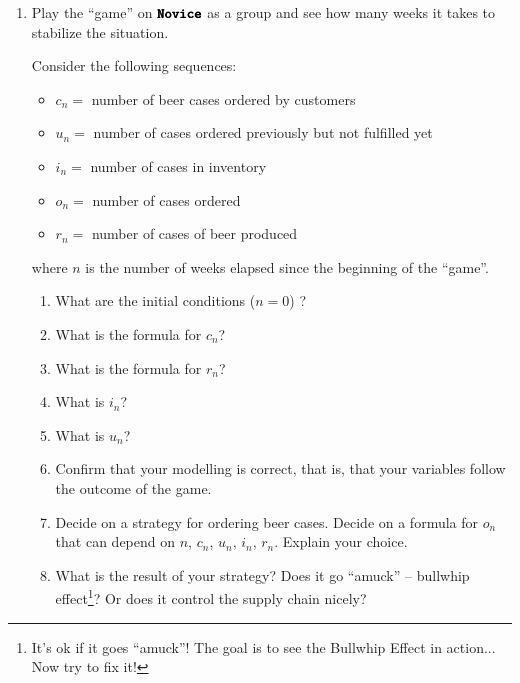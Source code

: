 \begin{enumerate}[label = \emph{\arabic*.}]

\item Play the ``game'' on $\pmb{\tt Novice}$ as a group and see how many weeks it takes to stabilize the situation.

Consider the following sequences:
\begin{itemize}
\item $c_n = $ number of beer cases ordered by customers
\item $u_n = $ number of cases ordered previously but not fulfilled yet
\item $i_n = $ number of cases in inventory
\item $o_n = $ number of cases ordered 
\item $r_n = $ number of cases of beer produced
\end{itemize}
where $n$ is the number of weeks elapsed since the beginning of the ``game''. \\

\begin{enumerate}[label = \emph{(\alph*)}]
\item What are the initial conditions ($n=0$) ?
\item What is the formula for $c_n$?


\item What is the formula for $r_n$? 


\item What is $i_n$?

\item What is $u_n$?


\item Confirm that your modelling is correct, that is, that your variables follow the outcome of the game.

\item Decide on a strategy for ordering beer cases. Decide on a formula for $o_n$ that can depend on $n$, $c_n$, $u_n$, $i_n$, $r_n$.
Explain your choice.

\item What is the result of your strategy? Does it go ``amuck'' -- bullwhip effect\footnote{It's ok if it goes ``amuck''! The goal is to see the Bullwhip Effect in action... Now try to fix it!}? Or does it control the supply chain nicely?


\end{enumerate}
\end{enumerate}
